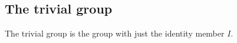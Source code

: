 
\subsection{The trivial group}

The trivial group is the group with just the identity member \(I\).

